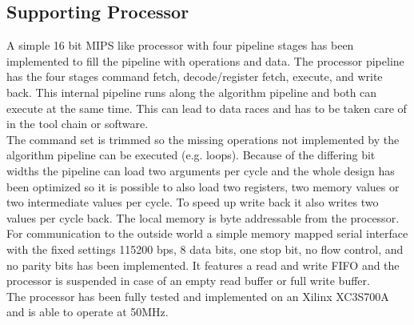 \documentclass[11pt,twocolumn,technote,a4paper]{IEEEtran}
\begin{document}
\subsection{Supporting Processor}
A simple 16 bit MIPS like processor with four pipeline stages has been
implemented to fill the pipeline with operations and data. The processor
pipeline has the four stages command fetch, decode/register fetch, execute,
and write back. This internal pipeline runs along the algorithm pipeline
and both can execute at the same time. This can lead to data races and has to
be taken care of in the tool chain or software.\\
The command set is trimmed so the missing operations not implemented by the
algorithm pipeline can be executed (e.g. loops). Because of the differing bit
widths the pipeline can load two arguments per cycle and the whole design has
been optimized so it is possible to also load two registers, two memory values
or two intermediate values per cycle. To speed up write back it also writes two
values per cycle back. The local memory is byte addressable from the processor.\\
For communication to the outside world a simple memory mapped serial
interface with the fixed settings 115200 bps, 8 data bits, one stop bit, no flow
control, and no parity bits has been implemented. It features a read and write
FIFO and the processor is suspended in case of an empty read buffer or full
write buffer.\\
The processor has been fully tested and implemented on an Xilinx XC3S700A and
is able to operate at 50MHz.
\end{document}
